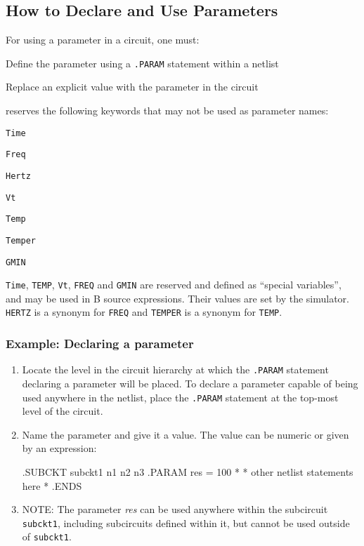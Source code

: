 \subsection{How to Declare and Use Parameters}

For using a parameter in a circuit, one must:
\begin{XyceItemize}
\item Define the parameter using a \verb+.PARAM+ statement within a netlist
\item Replace an explicit value with the parameter in the circuit
\end{XyceItemize}
 \Xyce{} reserves the following keywords that may not be used as parameter names:
\begin{XyceItemize}
\item \verb+Time+
\item \verb+Freq+ 
\item \verb+Hertz+
\item \verb+Vt+
\item \verb+Temp+ 
\item \verb+Temper+
\item \verb+GMIN+
\end{XyceItemize}

\texttt{Time}, \texttt{TEMP}, \texttt{Vt}, \texttt{FREQ} and \texttt{GMIN} are
reserved and defined as ``special variables'', and may be used in
B source expressions.   Their values are set by the simulator.  \texttt{HERTZ} is a synonym for \texttt{FREQ} and \texttt{TEMPER} is a synonym for \texttt{TEMP}.

\subsubsection{Example:  Declaring a parameter}
\begin{enumerate}
\item Locate the level in the circuit hierarchy at which the \verb+.PARAM+
  statement declaring a parameter will be placed. To declare a parameter capable of being used anywhere in the netlist, place the \verb+.PARAM+ statement at the top-most level of the circuit.
\item Name the parameter and give it a value. The value can be numeric or given
  by an expression:
  \begin{vquote}
.SUBCKT subckt1 n1 n2 n3
.PARAM res = 100
*
* other netlist statements here
*
.ENDS
\end{vquote}
\item NOTE: The parameter \emph{res} can be used anywhere within the subcircuit
  \texttt{subckt1}, including subcircuits defined within it, but cannot be used outside
  of \texttt{subckt1}.
\end{enumerate}

